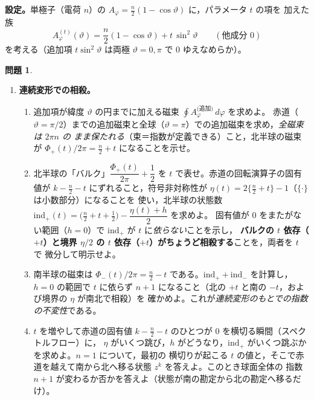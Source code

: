 \documentclass[dvipdfmx, uplatex]{jsarticle}
\theoremstyle{definition}
\newtheorem*{prob}{問題}
\begin{document}
\noindent\textbf{設定。}単極子（電荷 $n$）の $A_\varphi=\tfrac n2(1-\cos\vartheta)$ に，パラメータ $t$ の項を
加えた族
\[
    A_\varphi^{(t)}(\vartheta)=\frac n2(1-\cos\vartheta)+t\,\sin^2\vartheta\qquad(\text{他成分 }0)
\]
を考える（追加項 $t\sin^2\vartheta$ は両極 $\vartheta=0,\pi$ で $0$ ゆえなめらか）。

\begin{prob}
\begin{enumerate}[start=14]
\item \textbf{連続変形での相殺。}
\begin{enumerate}
\item 追加項が緯度 $\vartheta$ の円までに加える磁束 $\oint A_\varphi^{\text{(追加)}}\,d\varphi$ を求めよ。
赤道（$\vartheta=\pi/2$）までの追加磁束と全球（$\vartheta=\pi$）での追加磁束を求め，\emph{全磁束は $2\pi n$ の
まま保たれる}（束＝指数が定義できる）こと，北半球の磁束が $\Phi_+(t)/2\pi=\tfrac n2+t$ になることを示せ。
\item 北半球の「バルク」$\dfrac{\Phi_+(t)}{2\pi}+\dfrac12$ を $t$ で表せ。赤道の回転演算子の固有値が
$k-\tfrac n2-t$ にずれること，符号非対称性が $\eta(t)=2\{\tfrac n2+t\}-1$（$\{\cdot\}$ は小数部分）になることを
使い，北半球の状態数 $\mathrm{ind}_+(t)=\bigl(\tfrac n2+t+\tfrac12\bigr)-\dfrac{\eta(t)+h}{2}$ を求めよ。
固有値が $0$ をまたがない範囲（$h=0$）で $\mathrm{ind}_+$ が $t$ に\emph{依らない}ことを示し，
\textbf{バルクの $t$ 依存（$+t$）と境界 $\eta/2$ の $t$ 依存（$+t$）がちょうど相殺する}ことを，両者を $t$ で
微分して明示せよ。
\item 南半球の磁束は $\Phi_-(t)/2\pi=\tfrac n2-t$ である。$\mathrm{ind}_++\mathrm{ind}_-$ を計算し，
$h=0$ の範囲で $t$ に依らず $n+1$ になること（北の $+t$ と南の $-t$，および境界の $\eta$ が南北で相殺）を
確かめよ。これが\emph{連続変形のもとでの指数の不変性}である。
\item $t$ を増やして赤道の固有値 $k-\tfrac n2-t$ のひとつが $0$ を横切る瞬間（スペクトルフロー）に，
$\eta$ がいくつ跳び，$h$ がどうなり，$\mathrm{ind}_+$ がいくつ跳ぶかを求めよ。$n=1$ について，最初の
横切りが起こる $t$ の値と，そこで赤道を越えて南から北へ移る状態 $z^k$ を答えよ。このとき球面全体の
指数 $n+1$ が変わるか否かを答えよ（状態が南の勘定から北の勘定へ移るだけ）。
\end{enumerate}
\end{enumerate}
\end{prob}

\end{document}
